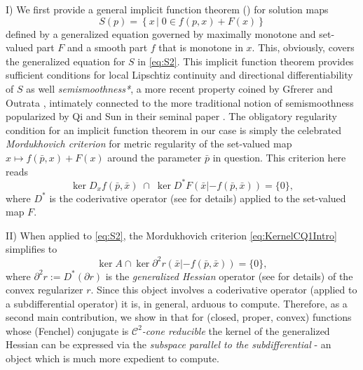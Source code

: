 \documentclass[reqno]{amsart}
\numberwithin{equation}{section}
\newcommand{\set}[2]{\left\{#1\,\left\vert\; #2\right.\right\}}
\begin{document}
\noindent
I) We first provide a general implicit function theorem () for solution maps 
\[
S(p)=\set{x}{ 0\in f(p,x)+F(x)}
\]
 defined by a generalized equation governed by  maximally monotone and  set-valued part $F$ and a smooth part $f$ that is monotone in $x$. This, obviously, covers the generalized equation for $S$ in \eqref{eq:S2}. 
 This implicit function theorem provides sufficient conditions for local Lipschtiz continuity and directional differentiability of  $S$ as well {\em semismoothness*}, a more recent property coined by Gfrerer and Outrata \cite{GfO 21}, intimately connected to the more traditional notion of semismoothness popularized by Qi and Sun in their seminal paper \cite{QS 93}. The obligatory regularity condition for an implicit function theorem in our case is  simply the celebrated {\em Mordukhovich criterion}  \cite{Mor 84, Mor 92, RoW 98} for metric regularity   of the set-valued map $x\mapsto f(\bar p,x)+F(x)$ around the parameter $\bar p$ in question. This  criterion here  reads 
\begin{equation}\label{eq:KernelCQ1Intro}
\ker D_xf(\bar p,\bar x) \;\cap\; \ker D^*F(\bar x|-f(\bar p,\bar x))=\{0\},
\end{equation}
where $D^*$ is the coderivative operator (see  for details) applied to the set-valued map $F$.

\medskip

\noindent
II) When applied to \eqref{eq:S2}, the Mordukhovich criterion \eqref{eq:KernelCQ1Intro} simplifies to 
\begin{equation}\label{eq:MordDataIntro}
    \ker A \cap \ker \partial^2 r(\bar{x} | -f(\bar{p}, \bar{x})) = \{0\}, 
\end{equation}
where $ \partial^2 r:=D^*(\partial r)$ is the {\em generalized Hessian} operator (see  for details) of the convex regularizer $r$. Since this object involves a coderivative operator (applied to a subdifferential operator) it is, in general, arduous to compute. Therefore, as a second main contribution, we show in  that
for (closed, proper, convex)  functions  whose (Fenchel) conjugate  is {\em $\mathcal{C}^2$-cone reducible} the kernel of the generalized Hessian can be expressed via the {\em subspace parallel to the subdifferential}  - an object which is much more expedient to compute.
\medskip
\end{document}
